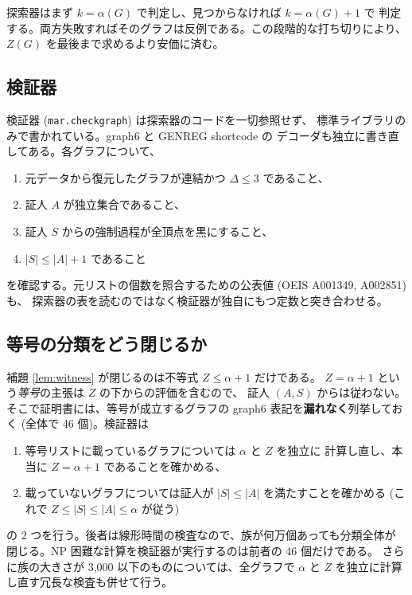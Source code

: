 \documentclass[paper=a4,fontsize=10.5pt,jafontsize=10.5pt]{jlreq}
\theoremstyle{plain}
\theoremstyle{definition}
\begin{document}
探索器はまず $k = \alpha(G)$ で判定し、見つからなければ $k = \alpha(G)+1$ で
判定する。両方失敗すればそのグラフは反例である。この段階的な打ち切りにより、
$Z(G)$ を最後まで求めるより安価に済む。

\subsection{検証器}

検証器 (\texttt{mar.checkgraph}) は探索器のコードを一切参照せず、
標準ライブラリのみで書かれている。graph6 と GENREG shortcode の
デコーダも独立に書き直してある。各グラフについて、

\begin{enumerate}
\item 元データから復元したグラフが連結かつ $\Delta \le 3$ であること、
\item 証人 $A$ が独立集合であること、
\item 証人 $S$ からの強制過程が全頂点を黒にすること、
\item $|S| \le |A| + 1$ であること
\end{enumerate}

を確認する。元リストの個数を照合するための公表値 (OEIS A001349, A002851) も、
探索器の表を読むのではなく検証器が独自にもつ定数と突き合わせる。

\subsection{等号の分類をどう閉じるか}\label{sec:eq}

補題 \ref{lem:witness} が閉じるのは不等式 $Z \le \alpha+1$ だけである。
$Z = \alpha+1$ という\emph{等号}の主張は $Z$ の下からの評価を含むので、
証人 $(A,S)$ からは従わない。そこで証明書には、等号が成立するグラフの
graph6 表記を\textbf{漏れなく}列挙しておく (全体で 46 個)。検証器は

\begin{enumerate}
\item 等号リストに載っているグラフについては $\alpha$ と $Z$ を独立に
      計算し直し、本当に $Z = \alpha+1$ であることを確かめる、
\item 載っていないグラフについては証人が $|S| \le |A|$ を満たすことを確かめる
      (これで $Z \le |S| \le |A| \le \alpha$ が従う)
\end{enumerate}

の 2 つを行う。後者は線形時間の検査なので、族が何万個あっても分類全体が
閉じる。NP 困難な計算を検証器が実行するのは前者の 46 個だけである。
さらに族の大きさが 3,000 以下のものについては、全グラフで
$\alpha$ と $Z$ を独立に計算し直す冗長な検査も併せて行う。
\end{document}
